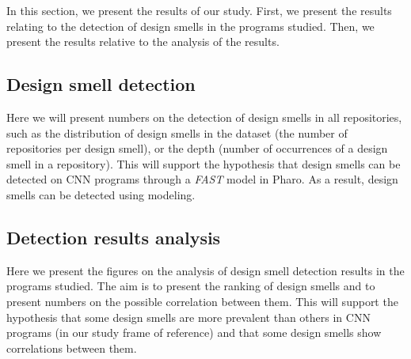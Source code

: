 \label{sec:results}
In this section, we present the results of our study. First, we present the results relating to the detection of design smells in the programs studied. Then, we present the results relative to the analysis of the results.
\emph{}

\subsection{Design smell detection}
\label{sec:results1}
Here we will present numbers on the detection of design smells in all repositories, such as the distribution of design smells in the dataset (the number of repositories per design smell), or the depth (number of occurrences of a design smell in a repository). This will support the hypothesis that design smells can be detected on CNN programs through a \emph{FAST} model in Pharo. As a result, design smells can be detected using modeling.


\subsection{Detection results analysis}
\label{sec:results2}
Here we present the figures on the analysis of design smell detection results in the programs studied. The aim is to present the ranking of design smells and to present numbers on the possible correlation between them. This will support the hypothesis that some design smells are more prevalent than others in CNN programs (in our study frame of reference) and that some design smells show correlations between them.

